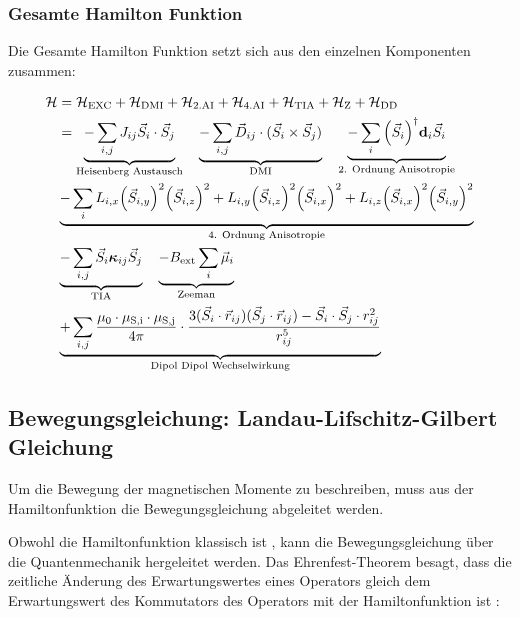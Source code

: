 \documentclass[main.tex]{subfiles}
\begin{document}
\subsubsection*{Gesamte Hamilton Funktion}

Die Gesamte Hamilton Funktion setzt sich aus den einzelnen Komponenten zusammen:

\begin{align}
	\mathcal{H} & = \mathcal{H}_{\text{EXC}} + \mathcal{H}_{\text{DMI}} +
	\mathcal{H}_{\text{2.AI}} + \mathcal{H}_{\text{4.AI}} +
	\mathcal{H}_{\text{TIA}} + \mathcal{H}_{\text{Z}} +
	\mathcal{H}_{\text{DD}}\label{eq:hamilton}\nonumber \\
	& = \underbrace{-\sum_{i,j} J_{ij} \vec{S}_i \cdot \vec{S}_j}_\text{Heisenberg Austausch} %
	\quad \underbrace{-\sum_{i,j} \vec{D}_{ij} \cdot (\vec{S}_i \times \vec{S}_j)}_\text{DMI} %
	\quad \underbrace{-\sum_{i} \qty(\vec{S}_i)^\dagger \mat{d}_i \vec{S}_i}_\text{2. Ordnung Anisotropie}\nonumber  \\ %
	& \underbrace{-\sum_{i} L_{i,x} \qty(\vec{S}_{i,y})^2 \qty(\vec{S}_{i,z})^2 + L_{i,y} \qty(\vec{S}_{i,z})^2 \qty(\vec{S}_{i,x})^2 + L_{i,z} \qty(\vec{S}_{i,x})^2 \qty(\vec{S}_{i,y})^2}_\text{4. Ordnung Anisotropie} \nonumber\\ %
	& \underbrace{-\sum_{i,j} \vec{S}_i \mat{\kappa}_{ij} \vec{S}_j}_\text{TIA}%
	\quad \underbrace{- B_\text{ext} \sum_{i} \vec{\mu}_i}_\text{Zeeman} \nonumber\\ %
	& \underbrace{ + \sum_{i,j} \frac{\mu_0 \cdot \mu_{\text{S,i}} \cdot \mu_{\text{S,j}}}{4\pi} \cdot \frac{3(\vec{S}_i \cdot \vec{r}_{ij})(\vec{S}_j \cdot \vec{r}_{ij}) - \vec{S}_i \cdot \vec{S}_j \cdot r_{ij}^2}{r_{ij}^5}}_\text{Dipol Dipol Wechselwirkung} %
\end{align}

\subsection{Bewegungsgleichung: Landau-Lifschitz-Gilbert Gleichung}
Um die Bewegung der magnetischen Momente zu beschreiben, muss aus der Hamiltonfunktion die Bewegungsgleichung abgeleitet werden.

Obwohl die Hamiltonfunktion klassisch ist , kann die Bewegungsgleichung über die Quantenmechanik hergeleitet werden. 
Das Ehrenfest-Theorem besagt, dass die zeitliche Änderung des Erwartungswertes eines Operators gleich dem Erwartungswert des Kommutators des Operators mit der Hamiltonfunktion ist \cite{qm-1-Schwabl}:
\end{document}
